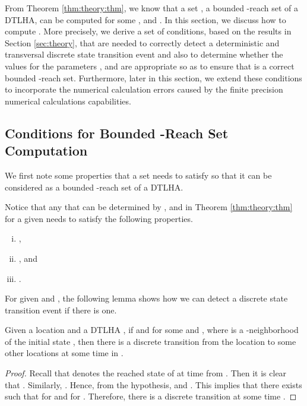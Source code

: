 From Theorem \ref{thm:theory:thm}, we know that a set , a bounded -reach set of a DTLHA, can be computed for some , and . 
In this section, we discuss how to compute .
More precisely, we derive a set of conditions, based on the results in Section \ref{sec:theory}, that are needed to correctly detect a deterministic and transversal discrete state transition event and also to determine whether the values for the parameters , and  are appropriate so as to ensure that  is a correct bounded -reach set.
Furthermore, later in this section, we extend these conditions to incorporate the numerical calculation errors caused by the finite precision numerical calculations capabilities. 



\subsection{Conditions for Bounded -Reach Set Computation}  \label{sec:cond:exact}

We first note some properties that a set  needs to satisfy so that it can be considered as a bounded -reach set of a DTLHA.

\begin{rem} \label{rem:cond:exact}
Notice that any  that can be determined by , and  in Theorem \ref{thm:theory:thm} for a given  needs to satisfy the following properties.
\begin{enumerate}[(i)]
	\item , 
	\item  , and
	\item .	
\end{enumerate}
\end{rem}


For given  and , the following lemma shows how we can detect a discrete state transition event if there is one.


\begin{lem} \label{lem:cond:exact:trans}
Given a location  and a DTLHA , 
if  and  for some  and , where  is a -neighborhood of the initial state , then there is a discrete transition from the location  to some other locations at some time in .
\end{lem}
\begin{proof}
Recall that  denotes the reached state of  at time  from .
Then it is clear that . 
Similarly,  . 
Hence, from the hypothesis,  and .
This implies that there exists  such that  for  and   for .
Therefore, there is a discrete transition at some time .
\end{proof}


